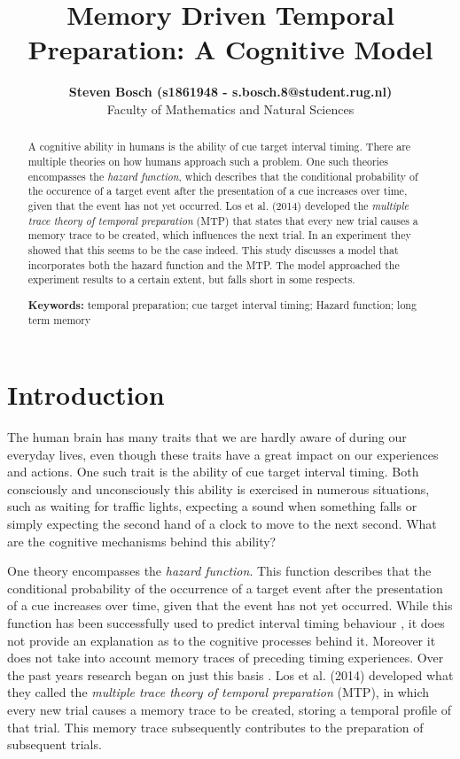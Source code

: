 \documentclass[10pt,letterpaper]{article}
\title{Memory Driven Temporal Preparation: A Cognitive Model}
\author{{\large \bf Steven Bosch (s1861948 - s.bosch.8@student.rug.nl)} \\
  Faculty of Mathematics and Natural Sciences}
\begin{document}
\maketitle

\begin{abstract}
A cognitive ability in humans is the ability of cue target interval timing. There are multiple theories on how humans approach such a problem. One such theories encompasses the \textit{hazard function}, which describes that the conditional probability of the occurence of a target event after the presentation of a cue increases over time, given that the event has not yet occurred. Los et al. (2014) developed the \textit{multiple trace theory of temporal preparation} (MTP) that states that every new trial causes a memory trace to be created, which influences the next trial. In an experiment they showed that this seems to be the case indeed. This study discusses a model that incorporates both the hazard function and the MTP. The model approached the experiment results to a certain extent, but falls short in some respects.

\textbf{Keywords:} 
temporal preparation; cue target interval timing; Hazard function; long term memory
\end{abstract}

\section{Introduction}
The human brain has many traits that we are hardly aware of during our everyday lives, even though these traits have a great impact on our experiences and actions. One such trait is the ability of cue target interval timing. Both consciously and unconsciously this ability is exercised in numerous situations, such as waiting for traffic lights, expecting a sound when something falls or simply expecting the second hand of a clock to move to the next second. What are the cognitive mechanisms behind this ability?

One theory encompasses the \textit{hazard function}. This function describes that the conditional probability of the occurrence of a target event after the presentation of a cue increases over time, given that the event has not yet occurred. While this function has been successfully used to predict interval timing behaviour \cite{Nobre, Vangkilde}, it does not provide an explanation as to the cognitive processes behind it. Moreover it does not take into account memory traces of preceding timing experiences. Over the past years research began on just this basis \cite{Los1, Howard, Taatgen}. Los et al. (2014) developed what they called the \textit{multiple trace theory of temporal preparation} (MTP), in which every new trial causes a memory trace to be created, storing a temporal profile of that trial. This memory trace subsequently contributes to the preparation of subsequent trials. 
\end{document}
